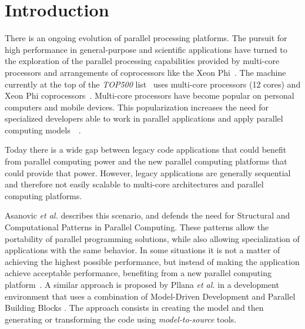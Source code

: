 \section{Introduction}
\label{sec:introduction}

There is an ongoing evolution of parallel processing platforms. The pursuit for high performance in general-purpose and scientific applications have turned to the exploration of the parallel processing capabilities provided by multi-core processors and arrangements of coprocessors like the Xeon Phi~\cite{xeonphiRuntime}. The machine currently at the top of the \textit{TOP500} list~\cite{dongarra1997top500} uses multi-core processors (12 cores) and Xeon Phi coprocessors~\cite{top500:site}.
Multi-core processors have become popular on personal computers and mobile devices. This popularization increases the need for specialized developers able to work in parallel applications and apply parallel computing models~\cite{Chen:2009:ChallengesMIC}~\cite{okur2012developers}.

Today there is a wide gap between legacy code applications that could benefit from parallel computing power and the new parallel computing platforms that could provide that power. However, legacy applications are generally sequential and therefore not easily scalable to multi-core architectures and parallel computing platforms. 

Asanovic \textit{et al.} \cite{Asanovic2009} describes this scenario, and defends the need for Structural and Computational Patterns in Parallel Computing. These patterns allow the portability of parallel programming solutions, while also allowing specialization of applications with the same behavior. In some situations it is not a matter of achieving the highest possible performance, but instead of making the application achieve acceptable performance, benefiting from a new parallel computing platform~\cite{Asanovic2009}. A similar approach is proposed by Pllana \textit{et al.} in a development environment that uses a combination of Model-Driven Development and Parallel Building Blocks \cite{Pllana:2009}. The approach consists in creating the model and then generating or transforming the code using \emph{model-to-source} tools.

